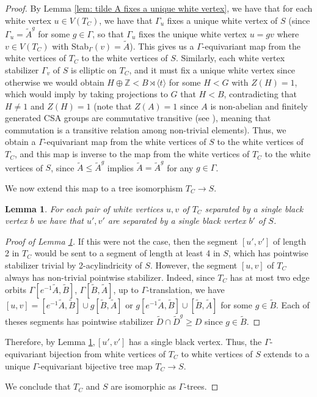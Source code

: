 \documentclass{amsart}
\newcommand{\Z}{\mathbb{Z}}
\theoremstyle{plain}
\newtheorem{lemma}[thm]{Lemma}
\theoremstyle{definition}
\theoremstyle{remark}
\begin{document}
\begin{proof}
    By Lemma \ref{lem: tilde A fixes a unique white vertex}, we have that for each white vertex $u \in V(T_C)$, we have that $\Gamma_u$ fixes a unique white vertex of $S$ (since $\Gamma_u = \tilde{A}^g$ for some $g \in \Gamma$, so that $\Gamma_u$ fixes the unique white vertex $u=gv$ where $v \in V(T_C)$ with Stab$_{\Gamma} (v) = \tilde{A}$). This gives us a $\Gamma$-equivariant map from the white vertices of $T_C$ to the white vertices of $S$. Similarly, each white vertex stabilizer $\Gamma_v$ of $S$ is elliptic on $T_C$, and it must fix a unique white vertex since otherwise we would obtain $H \oplus \Z < B \rtimes \langle t \rangle$ for some $H < G$ with $Z(H) = 1$, which would imply by taking projections to $G$ that $H < B$, contradicting that $H \neq 1$ and $Z(H) = 1$ (note that $Z(A) = 1$ since $A$ is non-abelian and finitely generated CSA groups are commutative transitive (see \cite{CT_CSA}), meaning that commutation is a transitive relation among non-trivial elements). Thus, we obtain a $\Gamma$-equivariant map from the white vertices of $S$ to the white vertices of $T_C$, and this map is inverse to the map from the white vertices of $T_C$ to the white vertices of $S$, since $\tilde{A} \leq \tilde{A}^g$ implies $\tilde{A} = \tilde{A}^g$ for any $g \in \Gamma$. 

    We now extend this map to a tree isomorphism $T_C \to S$.
    
    \begin{lemma}
        \label{lem: Tree of cylinders map is a tree iso}
        For each pair of white vertices $u,v$ of $T_C$ separated by a single black vertex $b$ we have that $u', v'$ are separated by a single black vertex $b'$ of $S$.
    \end{lemma}

    \begin{proof}[Proof of Lemma \ref{lem: Tree of cylinders map is a tree iso}]
        If this were not the case, then the segment $[u',v']$ of length 2 in $T_C$ would be sent to a segment of length at least 4 in $S$, which has pointwise stabilizer trivial by 2-acylindricity of $S$. However, the segment $[u,v]$ of $T_C$ always has non-trivial pointwise stabilizer. Indeed, since $T_C$ has at most two edge orbits $\Gamma [e^{-1} \tilde{A}, \tilde{B}]$, $\Gamma [\tilde{B}, \tilde{A}]$, up to $\Gamma$-translation, we have $[u,v] = [e^{-1} \tilde{A}, \tilde{B}] \cup g[\tilde{B}, \tilde{A}]$ or $g[e^{-1} \tilde{A}, \tilde{B}] \cup [\tilde{B}, \tilde{A}]$ for some $g \in \tilde{B}$. Each of theses segments has pointwise stabilizer $\tilde{D} \cap \tilde{D}^g \geq D$ since $g \in \tilde{B}$. 
    \end{proof}

    Therefore, by Lemma \ref{lem: Tree of cylinders map is a tree iso}$, [u',v']$ has a single black vertex. Thus, the $\Gamma$-equivariant bijection from white vertices of $T_C$ to white vertices of $S$ extends to a unique $\Gamma$-equivariant bijective tree map $T_C \to S$. 

    We conclude that $T_C$ and $S$ are isomorphic as $\Gamma$-trees.
    
\end{proof}
\end{document}
